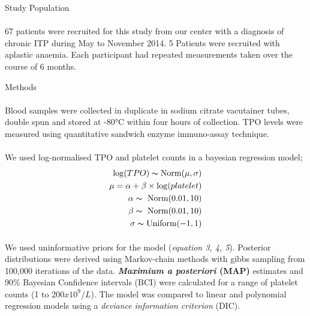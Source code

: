 \documentclass[landscape,a0paper,fontscale=0.285]{beamer} %
\newlength{\onecolwid}
\begin{document}
\begin{frame}[t]
\begin{columns}[t]
\begin{column}{\onecolwid}
\begin{block}{Study Population}
\paragraph{} 67 patients were recruited for this study from our center with a diagnosis of chronic ITP during May to November 2014. 5 Patients were recruited with aplastic anaemia. Each participant had repeated measurements taken over the course of 6 months.  



\end{block}

\begin{block}{Methods}
\paragraph{}Blood samples were collected in duplicate in sodium citrate vacutainer tubes, double spun and stored at -80°C within four hours of collection. TPO levels were measured using quantitative sandwich enzyme immuno-assay technique.
\paragraph{} We used log-normalised TPO and platelet counts in a bayesian regression model;
\begin{align}
    \log(TPO) \thicksim \text{Norm}(\mu, \sigma) \\
    \mu = \alpha + \beta\times \log(platelet) \\
    \alpha \thicksim\ \text{Norm}(0.01, 10) \\
    \beta \thicksim\ \text{Norm}(0.01, 10) \\
    \sigma \thicksim \text{Uniform}(-1, 1)
\end{align}
\paragraph{} We used uninformative priors for the model (\textit{equation 3, 4, 5}). Posterior distributions were derived using Markov-chain methods with gibbs sampling from 100,000 iterations of the data. \textbf{\textit{Maximium a posteriori} (MAP)} estimates and 90\% Bayesian Confidence intervals (BCI) were calculated for a range of platelet counts (1 to 200$x10^9/L$). The model was compared to linear and polynomial regression models using a \emph{deviance information criterion} (DIC). 
\end{block}


\end{column}
\end{columns}
\end{frame}
\end{document}
